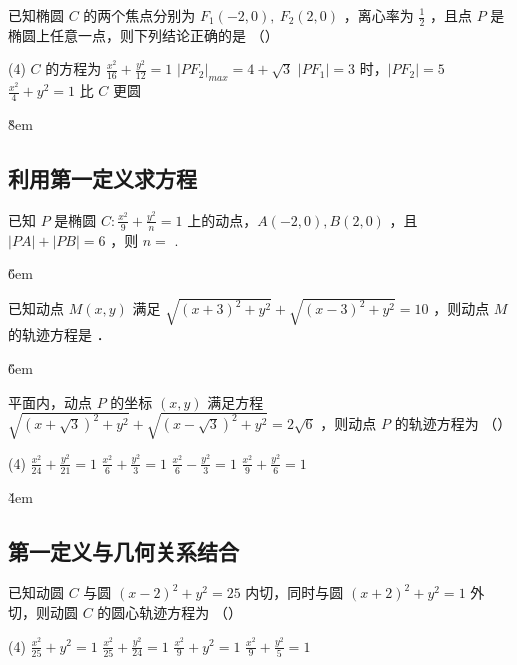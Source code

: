 \begin{example}
    已知椭圆 $C$ 的两个焦点分别为 $F_1(-2,0), ~ F_2(2,0)$ ，离心率为 $\frac{1}{2}$ ，且点 $P$ 是椭圆上任意一点，则下列结论正确的是 （\qquad）
    \begin{tasks}(4)
        \task $C$ 的方程为 $\frac{x^2}{16}+\frac{y^2}{12}=1$
        \task $\left|P F_2\right|_{max} = 4+\sqrt{3}$
        \task $\left|P F_1\right|=3$ 时，$\left|P F_2\right|=5$
        \task $\frac{x^2}{4}+y^2=1$ 比 $C$ 更圆
    \end{tasks}
\end{example}

\v{8em}

\subsection{利用第一定义求方程}

\begin{example}
    已知 $P$ 是椭圆 $C: \frac{x^2}{9}+\frac{y^2}{n}=1$ 上的动点，$A(-2,0), B(2,0)$ ，且 $|P A|+|P B|=6$ ，则 $n=$ \underline{\qquad}.
\end{example}

\v{6em}

\begin{example}
    已知动点 $M(x, y)$ 满足 $\sqrt{(x+3)^2+y^2}+\sqrt{(x-3)^2+y^2}=10$ ，则动点 $M$ 的轨迹方程是 \underline{\qquad}．
\end{example}

\v{6em}

\begin{example}
    平面内，动点 $P$ 的坐标 $(x, y)$ 满足方程 $\sqrt{(x+\sqrt{3})^2+y^2}+\sqrt{(x-\sqrt{3})^2+y^2}=2 \sqrt{6}$ ，则动点 $P$ 的轨迹方程为 （\qquad）
    \begin{tasks}(4)
        \task $\frac{x^2}{24}+\frac{y^2}{21}=1$
        \task $\frac{x^2}{6}+\frac{y^2}{3}=1$
        \task $\frac{x^2}{6}-\frac{y^2}{3}=1$
        \task $\frac{x^2}{9}+\frac{y^2}{6}=1$
    \end{tasks}
\end{example}

\v{4em}

\subsection{第一定义与几何关系结合}

\begin{example}
    已知动圆 $C$ 与圆 $(x-2)^2+y^2=25$ 内切，同时与圆 $(x+2)^2+y^2=1$ 外切，则动圆 $C$ 的圆心轨迹方程为 （\qquad）
    \begin{tasks}(4)
        \task $\frac{x^2}{25}+y^2=1$
        \task $\frac{x^2}{25}+\frac{y^2}{24}=1$
        \task $\frac{x^2}{9}+y^2=1$
        \task $\frac{x^2}{9}+\frac{y^2}{5}=1$
    \end{tasks}
\end{example}

